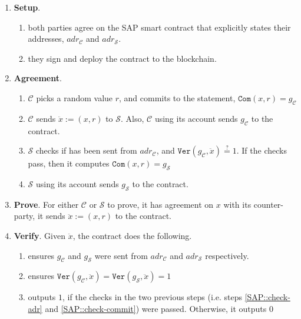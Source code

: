  \begin{enumerate}
 \item\textbf{Setup}.  

 \begin{enumerate}
  \item both parties agree on the SAP smart contract that  explicitly states their addresses, $adr_{\scriptscriptstyle\mathcal{C}}$ and $adr_{\scriptscriptstyle\mathcal{S}}$.
 \item they sign and deploy the contract to the blockchain.
   \end{enumerate}
    \item\textbf{Agreement}.
  \begin{enumerate}
   \item $\mathcal C$ picks a random value $r$, and commits to the statement, $\mathtt{Com}(x,r)=g_{\scriptscriptstyle \mathcal{C}}$
   
   
   \item $\mathcal C$ sends $\ddot{x}:=(x,r)$  to  $\mathcal S$. Also, $\mathcal C$ using its account sends $g_{\scriptscriptstyle\mathcal C}$ to the contract. 
   \item $\mathcal S$ checks if has been sent from $adr_{\scriptscriptstyle \mathcal{C}}$, and $\mathtt{Ver}(g_{\scriptscriptstyle\mathcal C}, \ddot{x})\stackrel{?}=1$. If the checks pass, then  it computes $\mathtt{Com}(x,r)=g_{\scriptscriptstyle\mathcal S}$
   
   \item $\mathcal S$ using its account sends   $g_{\scriptscriptstyle\mathcal S}$ to the contract. 
    \end{enumerate}
   \item\textbf{Prove}. For either $\mathcal C$ or $\mathcal S$ to prove, it has agreement on $x$ with its counter-party, it sends $\ddot{x}:=(x, r)$  to the contract. 
 \item\textbf{Verify}. Given $\ddot{x}$, the contract does the following. 
   \begin{enumerate}
   
\item\label{SAP::check-adr} ensures $g_{\scriptscriptstyle\mathcal C}$ and $g_{\scriptscriptstyle\mathcal S}$ were sent from   $adr_{\scriptscriptstyle \mathcal{C}}$ and  $adr_{\scriptscriptstyle \mathcal{S}}$  respectively. 
  
   \item\label{SAP::check-commit} ensures $\mathtt{Ver}(g_{\scriptscriptstyle\mathcal C},\ddot{x})=\mathtt{Ver}(g_{\scriptscriptstyle\mathcal S},\ddot{x}) =1$
   
   \item outputs $1$, if the checks in the two previous steps (i.e. steps \ref{SAP::check-adr} and \ref{SAP::check-commit}) were passed. Otherwise, it outputs $0$
    \end{enumerate}
 \end{enumerate}

